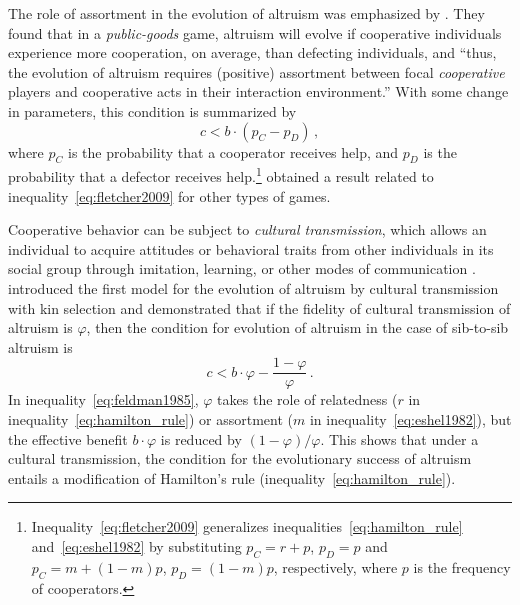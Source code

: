 \documentclass[12pt]{extarticle}
\begin{document}
The role of assortment in the evolution of altruism was emphasized by \citet{Fletcher2009assortment}.
They found that in a \emph{public-goods} game, altruism will evolve if cooperative individuals experience more cooperation, on average, than defecting individuals, and ``thus, the evolution of altruism requires (positive) assortment between focal \emph{cooperative} players and cooperative acts in their interaction environment.''
With some change in parameters, this condition is summarized by \citep[eq.~2.3]{Fletcher2009assortment}
\begin{equation} \label{eq:fletcher2009}
c < b \cdot (p_C - p_D ) \,,
\end{equation}
where $p_C$ is the probability that a cooperator receives help, and $p_D$ is the probability that a defector receives help.\footnote{Inequality~\ref{eq:fletcher2009} generalizes inequalities~\ref{eq:hamilton_rule} and~\ref{eq:eshel1982} by substituting $p_C=r + p$, $p_D=p$ and $p_C=m + (1-m)p$, $p_D=(1-m)p$, respectively, where $p$ is the frequency of cooperators.}
\citet{Bijma2010assortment} obtained a result related to inequality~\ref{eq:fletcher2009} for other types of games.

Cooperative behavior can be subject to \emph{cultural transmission}, which allows an individual to acquire attitudes or behavioral traits from other individuals in its social group through imitation, learning, or other modes of communication \citep{cavalli1981cultural,richerson2008not}.
\citet{feldman1985gene} introduced the first model for the evolution of altruism by cultural transmission with kin selection and demonstrated that if the fidelity of cultural transmission of altruism is $\varphi$, then the condition for evolution of altruism in the case of sib-to-sib altruism is \citep[Eq.~16]{feldman1985gene}
\begin{equation} \label{eq:feldman1985}
c < b \cdot \varphi - \frac{1-\varphi}{\varphi} \,.
\end{equation}
In inequality~\ref{eq:feldman1985}, $\varphi$ takes the role of relatedness ($r$ in inequality~\ref{eq:hamilton_rule}) or assortment ($m$ in inequality~\ref{eq:eshel1982}), but the effective benefit $b\cdot \varphi$ is  reduced by $(1-\varphi)/\varphi$.
This shows that under a cultural transmission, the condition for the evolutionary success of altruism entails a modification of Hamilton's rule (inequality~\ref{eq:hamilton_rule}).
\end{document}
